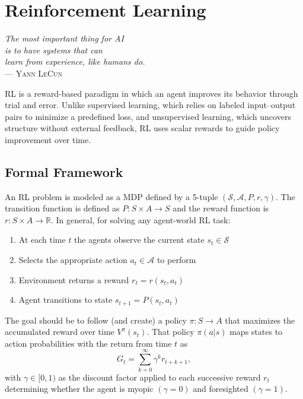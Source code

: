 \section{Reinforcement Learning}
\label{sec:rl_theory}

\begin{flushright}{\slshape    
    \textit{The most important thing for AI \\
    is to have systems that can \\
    learn from experience, like humans do.}} \\ \medskip
    --- \textsc{Yann LeCun} \cite{LECUNINTERVIEW2018}
\end{flushright}

\bigskip

\ac{RL} is a reward-based paradigm in which an agent improves its behavior through trial and error. Unlike supervised learning, which relies on labeled input–output pairs to minimize a predefined loss, and unsupervised learning, which uncovers structure without external feedback, \ac{RL} uses scalar rewards to guide policy improvement over time.

\subsection{Formal Framework}

An \ac{RL} problem is modeled as a \ac{MDP} defined by a 5-tuple $(\mathcal{S}, \mathcal{A}, P, r, \gamma)$. The transition function is defined as $P: S\times A \rightarrow S$ and the reward function is $r: S\times A \rightarrow \mathbb R$. In general, for solving any agent-world \ac{RL} task:
\begin{enumerate}
    \item At each time $t$ the agents observe the current state $s_t \in \mathcal{S}$
    \item Selects the appropriate action $a_t \in \mathcal{A}$ to perform
    \item Environment returns a reward $r_t=  r(s_t, a_t)$
    \item Agent transitions to state $s_{t+1} = P(s_t, a_t)$
\end{enumerate}

The goal should be to follow (and create) a policy $\pi: S \rightarrow A$ that maximizes the accumulated reward over time $V^\pi(s_t)$. That policy $\pi(a|s)$ maps states to action probabilities with the return from time $t$ as
\begin{equation*} 
    G_t = \sum_{k=0}^\infty \gamma^k r_{t+k+1},
\end{equation*}
with $\gamma \in [0,1)$ as the discount factor applied to each successive reward $r_t$ determining whether the agent is myopic $(\gamma =0)$ and foresighted $(\gamma = 1)$.

